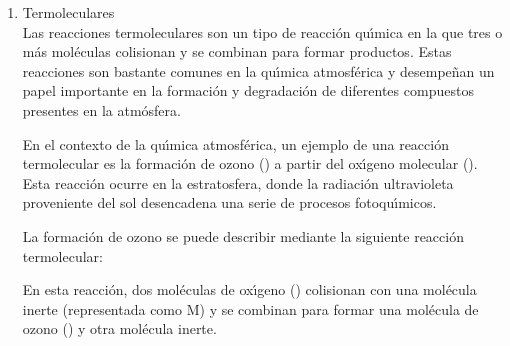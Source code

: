 \begin{enumerate}
La reacci\'on de segundo orden entre los \'oxidos de nitr\'ogeno y el ozono es importante en la qu\'{\i}mica atmosf\'erica, ya que contribuye a la formaci\'on de oxidantes fotoqu\'{\i}micos, como el di\'oxido de nitr\'ogeno (), que puede tener efectos adversos en la salud humana y en el  ambiente.

 \begin{equation*}
	-\frac{\mathrm{d}[\textrm{A}]}{\mathrm{d}t}=-\frac{\mathrm{d}[\textrm{B}]}{\mathrm{d}t}=\frac{\mathrm{d}[\textrm{C}]}{\mathrm{d}t}=k[\textrm{A}][\textrm{B}]
	\end{equation*}
	las unidades de k son {\centi\cubic\metre}/{molec$\cdot $\second}
	
En resumen, las reacciones de segundo orden son aquellas en las que la velocidad de reacci\'on depende de la concentraci\'on de dos reactivos diferentes. En el caso de la qu\'{\i}mica atmosf\'erica, un ejemplo de una reacci\'on de segundo orden es la reacci\'on entre los \'oxidos de nitr\'ogeno y el ozono. La velocidad de reacci\'on est\'a determinada por el producto de las concentraciones de ambos reactivos y desempe\~na un papel importante en la formaci\'on de contaminantes atmosf\'ericos como el smog fotoqu\'{\i}mico.

\item Termoleculares \\
Las reacciones termoleculares son un tipo de reacci\'on qu\'{\i}mica en la que tres o m\'as mol\'eculas colisionan y se combinan para formar productos. Estas reacciones son bastante comunes en la qu\'{\i}mica atmosf\'erica y desempe\~nan un papel importante en la formaci\'on y degradaci\'on de diferentes compuestos presentes en la atm\'osfera.

En el contexto de la qu\'{\i}mica atmosf\'erica, un ejemplo de una reacci\'on termolecular es la formaci\'on de ozono () a partir del ox\'{\i}geno molecular (). Esta reacci\'on ocurre en la estratosfera, donde la radiaci\'on ultravioleta proveniente del sol desencadena una serie de procesos fotoqu\'{\i}micos.

La formaci\'on de ozono se puede describir mediante la siguiente reacci\'on termolecular:


En esta reacci\'on, dos mol\'eculas de ox\'{\i}geno () colisionan con una mol\'ecula inerte (representada como M) y se combinan para formar una mol\'ecula de ozono () y otra mol\'ecula inerte.


\end{enumerate}
